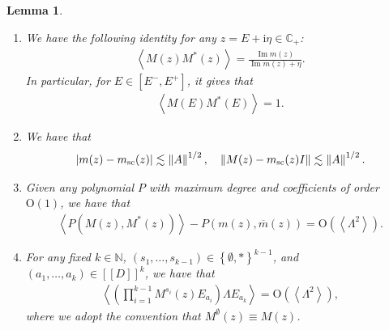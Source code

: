 \documentclass[10pt,reqno]{amsart}
\numberwithin{equation}{section}
\numberwithin{figure}{section}
\theoremstyle{plain} %
\newtheorem{lemma}[theorem]{Lemma}
\theoremstyle{definition} %
\renewcommand{\txt}[1]{\text{\rm{#1}}}
\newcommand{\C}{\mathbb{C}}
\newcommand{\N}{\mathbb{N}}
\newcommand{\ii}{\mathrm{i}}
\renewcommand{\Bar}{\overline}
\newcommand{\qq}[1]{[\![{#1}]\!]}
\newcommand{\pa}[1]{\left({#1}\right)}
\newcommand{\qa}[1]{\left[{#1}\right]}
\newcommand{\ha}[1]{\left\{{#1}\right\}}
\newcommand{\absa}[1]{\left\lvert #1 \right\rvert}
\newcommand{\norma}[1]{\left\lVert #1 \right\rVert}
\newcommand{\avga}[1]{\left\langle #1 \right\rangle}
\DeclareMathOperator{\im}{\mathrm{Im}}
\newcommand{\OO}{\mathrm{O}}
\numberwithin{equation}{section}
\begin{document}
\begin{lemma}
\begin{enumerate}
        \item  We have the following identity for any $z=E+\ii \eta\in \C_+$:
        \begin{equation}\label{equation_z_im_m}
            \begin{aligned}
                \avga{M(z)M^* (z) }=\frac{\im m (z) }{\im m (z) +\eta}.
            \end{aligned}
        \end{equation}
        In particular, for $E\in\qa{E^-,E^+}$, it gives that
    \begin{equation}\label{equation_E_in_spectrum}
            \begin{aligned}
                \avga{M(E)M^*(E)}=1 . %
            \end{aligned}
        \end{equation}

        \item We have that
        \begin{equation}\label{eq:msc}
            \begin{aligned}
                \absa{m (z) -m_{\txt{sc}} (z) }\lesssim \norma{A}^{1/2}, \quad \norma{M (z) -m_{\txt{sc}} (z)I }\lesssim \norma{A}^{1/2}.
            \end{aligned}
        \end{equation}

        \item Given any polynomial $P$ with maximum degree and coefficients of order $\OO\pa{1}$, we have that
    \begin{equation}\label{estimate_replace_M_by_m}
            \begin{aligned}
                \avga{P\pa{M (z) ,M^* (z) }}-P\pa{m (z) ,\Bar{m} (z) }=\OO\pa{\avga{\Lambda^2}} .
            \end{aligned}
        \end{equation}

        \item For any fixed $k\in \N$, $\pa{s_1,\ldots,s_{k-1}}\in \ha{\emptyset,*}^{k-1}$, and $\pa{a_1,\ldots,a_{k}}\in \qq{D}^{k}$, we have that
        \begin{equation}\label{add_one_more_Lambda}
            \begin{aligned}
                \avga{\pa{\prod_{i=1}^{k-1}M^{s_i}(z)E_{a_i}}\Lambda E_{a_{k}}}=\OO\pa{\avga{\Lambda^2}},
            \end{aligned}
        \end{equation}
        where we adopt the convention that $M^{\emptyset}(z)\equiv M(z)$.



\end{enumerate}
\end{lemma}
\end{document}
